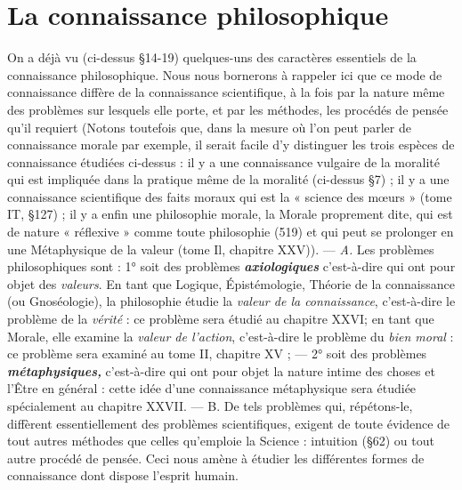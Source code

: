 \section{La connaissance philosophique}%
On a déjà vu (ci-dessus \S 14-19)
quelques-uns des caractères essentiels de la connaissance
philosophique. Nous nous bornerons à rappeler ici que ce mode
de connaissance diffère de la connaissance scientifique, à la fois par
la nature même des problèmes sur lesquels elle porte, et par les
méthodes, les procédés de pensée qu’il requiert
{\scriptsize (Notons toutefois que, dans la mesure où l’on peut parler de connaissance morale
par exemple, il serait facile d’y distinguer les trois espèces de connaissance étudiées
ci-dessus : il y a une connaissance vulgaire de la moralité qui est impliquée dans la pratique
même de la moralité (ci-dessus \S 7) ; il y a une connaissance scientifique des faits moraux
qui est la « science des mœurs » (tome IT, \S127) ; il y a enfin une philosophie morale,
la Morale proprement dite, qui est de nature « réflexive » comme toute philosophie
(519) et qui peut se prolonger en une Métaphysique de la valeur (tome Il, chapitre XXV))}.
— {\it A.} Les problèmes
philosophiques sont : 1° soit des problèmes \textbf{\textit {axiologiques}} c’est-à-dire
qui ont pour objet des {\it valeurs}. En tant que Logique, Épistémologie,
Théorie de la connaissance (ou Gnoséologie), la philosophie étudie la
{\it valeur de la connaissance}, c’est-à-dire le problème de la {\it vérité} : ce
problème sera étudié au chapitre XXVI; en tant que Morale, elle
examine la {\it valeur de l’action}, c’est-à-dire le problème du {\it bien moral} :
ce problème sera examiné au tome II, chapitre XV ; — 2° soit des
problèmes \textbf{\textit {métaphysiques,}} c’est-à-dire qui ont pour objet la nature
intime des choses et l’Être en général : cette idée d’une connaissance
métaphysique sera étudiée spécialement au chapitre XXVII. —
B. De tels problèmes qui, répétons-le, diffèrent essentiellement des
problèmes scientifiques, exigent de toute évidence de tout autres
méthodes que celles qu’emploie la Science : intuition (\S 62) ou tout
autre procédé de pensée. Ceci nous amène à étudier les différentes
formes de connaissance dont dispose l’esprit humain.

